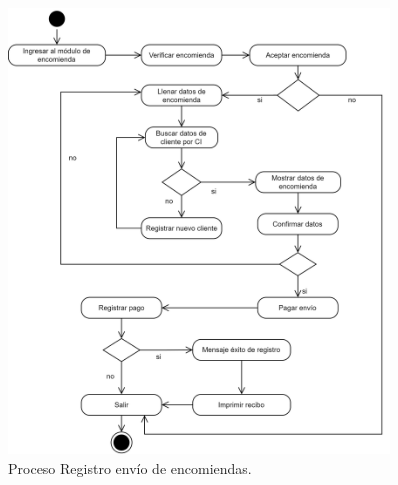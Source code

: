 	\begin{figure}[!h] %
		\caption[Diagrama de actividades - Registro de encomiendas]
		{\newline Proceso Registro envío de encomiendas.} %
		\centering
		\includegraphics[width=0.9\textwidth]{imagenes/cap_3/encomiendas.drawio.png} %
		
		\begin{flushleft}
		\end{flushleft}
		\vspace{-16pt}
		\label{fig:DA_encomiendas} %
	\end{figure}
	
	\vspace{0.3cm} %
	
